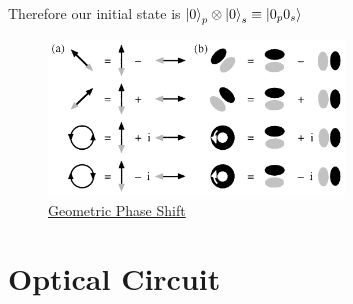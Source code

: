 \documentclass{article}
\begin{document}
Therefore our initial state is \( \ket{0}_p \otimes \ket{0}_s \equiv \ket{0_p 0_s}\)
\begin{figure}[H]
	\centering
	\includegraphics[width=0.7\textwidth, height=0.3\textheight]{phaseShift.jpeg}
	\caption{\href{https://opg.optica.org/ol/fulltext.cfm?uri=ol-24-7-430&id=37205}{Geometric Phase Shift}}
\end{figure}


\section{Optical Circuit}
\end{document}
